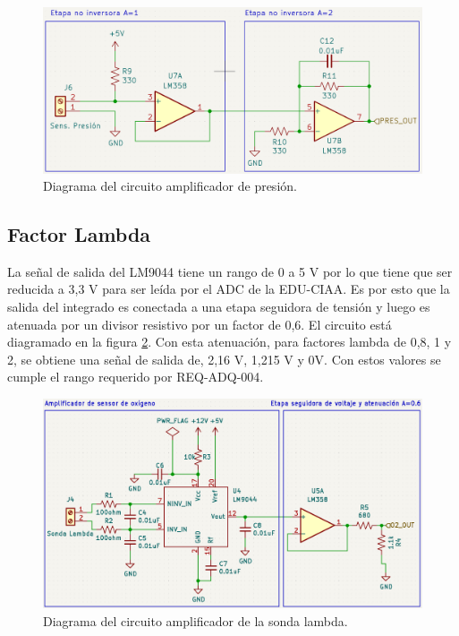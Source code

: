 \begin{figure}[htpb]
\centering
\includegraphics[width=\textwidth]{./Figures/circuito-presion.png}
\caption{Diagrama del circuito amplificador de presión.}
\label{fig:circuito-presion}
\end{figure}
\break
\subsection{Factor Lambda}

La señal de salida del LM9044 tiene un rango de 0 a 5 V por lo que tiene que ser reducida a 3,3 V para ser leída por el ADC de la EDU-CIAA. Es por esto que la salida del integrado es conectada a una etapa seguidora de tensión y luego es atenuada por un divisor resistivo por un factor de 0,6. El circuito está diagramado en la figura \ref{fig:circuito-o2}. Con esta atenuación, para factores lambda de 0,8, 1 y 2, se obtiene una señal de salida de, 2,16 V, 1,215 V y 0V. Con estos valores se cumple el rango requerido por REQ-ADQ-004.

\begin{figure}[htpb]
\centering
\includegraphics[width=\textwidth]{./Figures/ampli-o2.png}
\caption{Diagrama del circuito amplificador de la sonda lambda.}
\label{fig:circuito-o2}
\end{figure}

